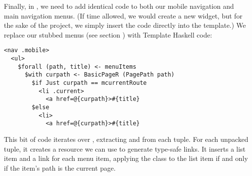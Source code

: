 Finally, in , we need to add identical code to both our mobile navigation and main navigation menus. (If time allowed, we would create a new widget, but for the sake of the project, we simply insert the code directly into the template.) We replace our stubbed menus (see section ) with Template Haskell code:

\begin{Verbatim}[samepage=true]
<nav .mobile>
  <ul>
    $forall (path, title) <- menuItems
      $with curpath <- BasicPageR (PagePath path)
        $if Just curpath == mcurrentRoute
          <li .current>
            <a href=@{curpath}>#{title}
        $else 
          <li>
            <a href=@{curpath}>#{title}
\end{Verbatim}

This bit of code iterates over , extracting  and  from each tuple. For each unpacked tuple, it creates a  resource we can use to generate type-safe links. It inserts a list item and a link for each menu item, applying the  class to the list item if and only if the item's path is the current page.

